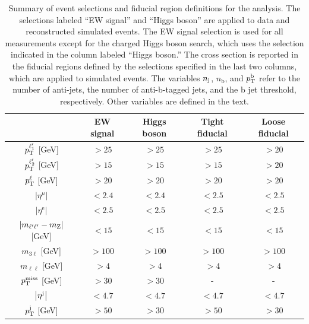 \begin{table}[!ht]
  \begin{center}
  \caption{Summary of event selections and fiducial region definitions for the analysis. 
    The selections labeled ``EW signal'' and ``Higgs boson'' are applied to data and reconstructed 
    simulated events.
    The EW signal selection is used for all measurements except for the charged Higgs boson search,
    which uses the selection indicated in the column labeled ``Higgs boson.''
    The \WZjj cross section is reported in the fiducial regions defined by the selections specified in 
    the last two columns, which are applied to simulated events. The variables
    $n_{\mathrm{j}}$, $n_{\mathrm{b}}$, and $p_{\mathrm{T}}^{\mathrm{b}}$ refer to the number of
    anti-\kt jets, the number of anti-\kt b-tagged jets, and the b jet 
    \pt threshold, respectively. Other variables are defined in the text.
    }
  \begin{tabular}{c|c|c|c|c}
  \hline
                                    & EW signal & Higgs boson & Tight fiducial & Loose fiducial\\
    \hline\hline
    $  p_{\mathrm{T}}^{\ell'_{1}}   $ [GeV]    & $> 25$    & $> 25$        & $ > 25 $       & $ > 20 $ \\
    $  p_{\mathrm{T}}^{\ell'_{2}}   $ [GeV]    & $> 15$    & $> 15$        & $ > 15 $       & $ > 20 $ \\
    $  p_{\mathrm{T}}^{\ell}     $ [GeV]       & $> 20$    & $> 20$        & $ > 20 $       & $ > 20 $ \\
  $\left|\eta^{\mu}\right|   $      & $< 2.4$   & $< 2.4$       & $ < 2.5$       & $ < 2.5$ \\
    $\left|\eta^{\mathrm{e}}\right|$      & $< 2.5$   & $< 2.5$       & $ < 2.5$       & $ < 2.5$ \\
  $\left|m_{\ell'\ell'}-m_{\mathrm{Z}}\right|$ [GeV] & $ < 15 $ & $ < 15 $ & $ < 15 $ & $ < 15 $ \\
  $m_{3\ell}                $ [GeV] & $> 100$   & $> 100$       & $> 100$        & $> 100$    \\
  $m_{\ell\ell}           $ [GeV]   & $> 4$     & $> 4$         & $>4$           & $>4$    \\
  $p_{\mathrm{T}}^\text{miss}                  $ [GeV] & $> 30$       & $> 30$     &   -            &   -     \\
  $\left|\eta^{\mathrm{j}}\right|  $      & $< 4.7$   & $< 4.7$       & $< 4.7$        & $< 4.7$ \\
    $p_{\mathrm{T}}^{\mathrm{j}}                $ [GeV] & $ > 50$   & $> 30$        & $> 50$         & $> 30$  \\

\end{tabular}
\end{center}
\end{table}
